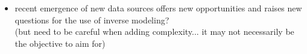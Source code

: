 \documentclass[letterpaper,8pt]{extarticle}  %
\begin{document}
\begin{doublespacing}
\begin{linenumbers}
\begin{itemize}
 \item recent emergence of new data sources offers new opportunities and raises new questions for the use of inverse modeling? \\
 (but need to be careful when adding complexity... it may not necessarily be the objective to aim for)
    
\end{itemize}


\end{linenumbers}
\end{doublespacing}




\end{document}
